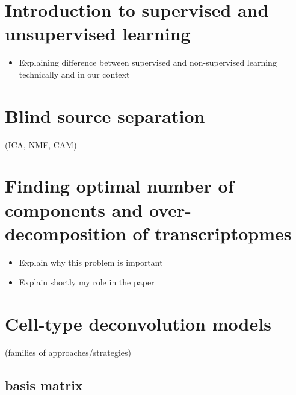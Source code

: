 \documentclass[12pt,]{book}
\providecommand{\tightlist}{%
  \setlength{\itemsep}{0pt}\setlength{\parskip}{0pt}}
\theoremstyle{definition}
\theoremstyle{definition}
\theoremstyle{definition}
\theoremstyle{remark}
\begin{document}
\hypertarget{introduction-to-supervised-and-unsupervised-learning}{%
\section{Introduction to supervised and unsupervised
learning}\label{introduction-to-supervised-and-unsupervised-learning}}

\begin{itemize}
\tightlist
\item
  Explaining difference between supervised and non-supervised learning
  technically and in our context
\end{itemize}

\hypertarget{blind-source-separation}{%
\section{Blind source separation}\label{blind-source-separation}}

(ICA, NMF, CAM)

\hypertarget{finding-optimal-number-of-components-and-over-decomposition-of-transcriptopmes}{%
\section{Finding optimal number of components and over-decomposition of
transcriptopmes}\label{finding-optimal-number-of-components-and-over-decomposition-of-transcriptopmes}}

\begin{itemize}
\tightlist
\item
  Explain why this problem is important
\item
  Explain shortly my role in the paper
\end{itemize}

\citep{Ulykbek2017}



\hypertarget{cell-type-deconvolution-models}{%
\section{Cell-type deconvolution
models}\label{cell-type-deconvolution-models}}

(families of approaches/strategies)

\hypertarget{basis-matrix}{%
\subsection{basis matrix}\label{basis-matrix}}
\end{document}
